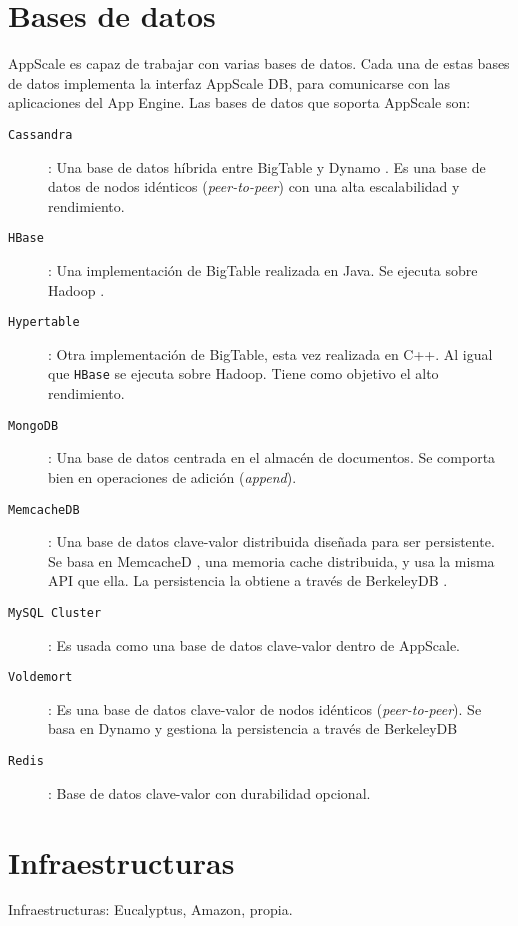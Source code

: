 \section{Bases de datos}


AppScale es capaz de trabajar con varias bases de datos. Cada una de estas bases de datos implementa la interfaz AppScale DB, para comunicarse con las aplicaciones del App Engine. Las bases de datos que soporta AppScale son:

\begin{description}
\item[\texttt{Cassandra}] \cite{appscale-cassandra}: Una base de datos híbrida entre BigTable \cite{appscale-bigtable} y Dynamo \cite{appscale-dynamo}. Es una base de datos de nodos idénticos (\emph{peer-to-peer}) con una alta escalabilidad y rendimiento.
\item[\texttt{HBase}] \cite{appscale-hbase}: Una implementación de BigTable realizada en Java. Se ejecuta sobre Hadoop \cite{appscale-hadoop}.
\item[\texttt{Hypertable}] \cite{appscale-hypertable}: Otra implementación de BigTable, esta vez realizada en C++. Al igual que \texttt{HBase} se ejecuta sobre Hadoop. Tiene como objetivo el alto rendimiento.
\item[\texttt{MongoDB}] \cite{appscale-mongodb}: Una base de datos centrada en el almacén de documentos. Se comporta bien en operaciones de adición (\emph{append}).
\item[\texttt{MemcacheDB}] \cite{appscale-memcachedb}: Una base de datos clave-valor distribuida diseñada para ser persistente. Se basa en MemcacheD \cite{appscale-memcached}, una memoria cache distribuida, y usa la misma API que ella. La persistencia la obtiene a través de BerkeleyDB \cite{appscale-berkeleydb}.
\item[\texttt{MySQL Cluster}] \cite{appscale-mysql}: Es usada como una base de datos clave-valor dentro de AppScale.
\item[\texttt{Voldemort}] \cite{appscale-voldemort}: Es una base de datos clave-valor de nodos idénticos (\emph{peer-to-peer}). Se basa en Dynamo y gestiona la persistencia a través de BerkeleyDB
\item[\texttt{Redis}] \cite{appscale-redis}: Base de datos clave-valor con durabilidad opcional.
\end{description}


\section{Infraestructuras}

Infraestructuras: Eucalyptus, Amazon, propia.
